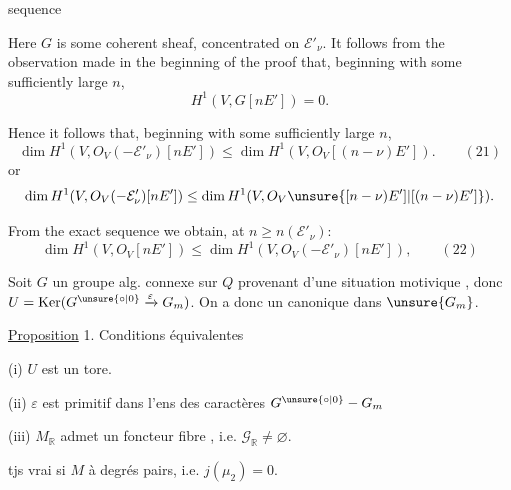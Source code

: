 sequence

Here $G$ is some coherent sheaf, concentrated on $\mathcal E'_\nu$. It follows from the observation made in the beginning of the proof that, beginning with some sufficiently large $n$,
\[
H^1(V,G[nE'])=0.
\]

Hence it follows that, beginning with some sufficiently large $n$,
\[
\dim H^1(V,O_V(-\mathcal E'_\nu)[nE'])\le\dim H^1(V,O_V[(n-\nu)E']).\qquad (21)
\]
or
\[
\dim H^1(V,O_V(-\mathcal E'_\nu)[nE'])\le\dim H^1(V,O_V\unsure{[n-\nu)E']|[(n-\nu)E']}).
\]

From the exact sequence
we obtain, at $n\ge n(\mathcal E'_\nu)$:
\[
\dim H^1(V,O_V[nE'])\le\dim H^1(V,O_V(-\mathcal E'_\nu)[nE']),\qquad (22)
\]

Soit $G$ un groupe  alg. connexe sur $Q$ provenant d'une situation motivique , donc $U=\operatorname{Ker}(G^{\unsure{\circ|0}}\xrightarrow{\varepsilon}G_m)$. On a donc un  canonique dans $\unsure{G_m}$.


\uline{Proposition} 1. Conditions équivalentes

(i) $U$ est un tore.

(ii) $\varepsilon$ est primitif dans l'ens des caractères $G^{\unsure{\circ|0}}\mathbin{-}G_m$

(iii) $M_{\mathbb R}$ admet un foncteur fibre , i.e. $\mathscr G_{\mathbb R}\ne\varnothing$.

 tjs vrai si $M$ à degrés pairs, i.e. $j(\mu_2)=0$.

